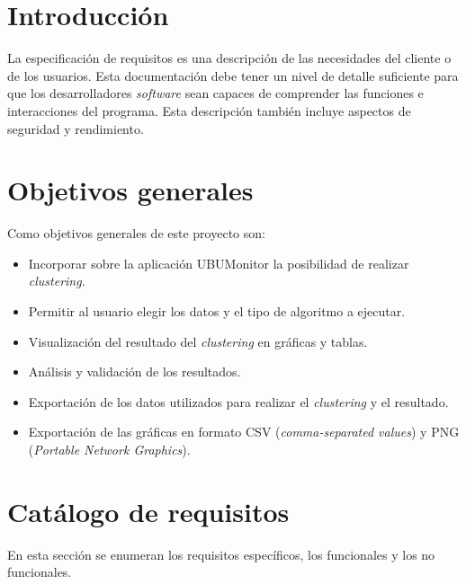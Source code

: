 
\section{Introducción}
La especificación de requisitos \cite{requisitos} es una descripción de las necesidades del cliente o de los usuarios. Esta documentación debe tener un nivel de detalle suficiente para que los desarrolladores \emph{software} sean capaces de comprender las funciones e interacciones del programa. Esta descripción también incluye aspectos de seguridad y rendimiento.

\section{Objetivos generales}
Como objetivos generales de este proyecto son:
\begin{itemize}
	\item Incorporar sobre la aplicación UBUMonitor la posibilidad de realizar \emph{clustering}.
	\item Permitir al usuario elegir los datos y el tipo de algoritmo a ejecutar.
	\item Visualización del resultado del \emph{clustering} en gráficas y tablas.
	\item Análisis y validación de los resultados.
	\item Exportación de los datos utilizados para realizar el \emph{clustering} y el resultado.
	\item Exportación de las gráficas en formato CSV (\emph{comma-separated values}) y PNG (\emph{Portable Network Graphics}).
	
\end{itemize}
\section{Catálogo de requisitos}
En esta sección se enumeran los requisitos específicos, los funcionales y los no funcionales.

